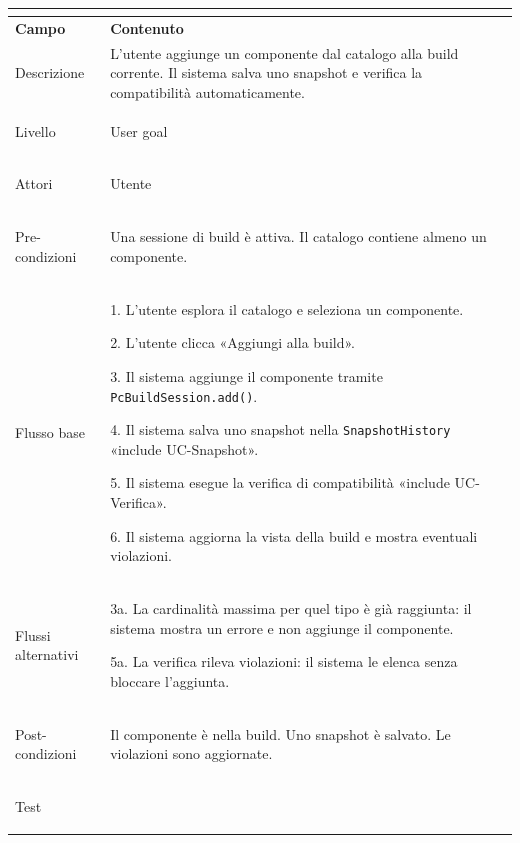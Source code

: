 \documentclass[11pt, a4paper]{article}
\begin{document}
\begin{tabularx}{\textwidth}{|>{\bfseries}p{3.8cm}|X|}

\hline

\multicolumn{2}{|l|}{\textbf{UC2 --- Aggiungi componente}} \\

\hline

Campo & \textbf{Contenuto} \\

\hline

Descrizione & L'utente aggiunge un componente dal catalogo alla build corrente. Il sistema salva uno snapshot e verifica la compatibilità automaticamente. \\

\hline

Livello & User goal \\

\hline

Attori & Utente \\

\hline

Pre-condizioni & Una sessione di build è attiva. Il catalogo contiene almeno un componente. \\

\hline

Flusso base & 

1. L'utente esplora il catalogo e seleziona un componente.\newline

2. L'utente clicca «Aggiungi alla build».\newline

3. Il sistema aggiunge il componente tramite \texttt{PcBuildSession.add()}.\newline

4. Il sistema salva uno snapshot nella \texttt{SnapshotHistory} «include UC-Snapshot».\newline

5. Il sistema esegue la verifica di compatibilità «include UC-Verifica».\newline

6. Il sistema aggiorna la vista della build e mostra eventuali violazioni. \\

\hline

Flussi alternativi & 

3a. La cardinalità massima per quel tipo è già raggiunta: il sistema mostra un errore e non aggiunge il componente.\newline

5a. La verifica rileva violazioni: il sistema le elenca senza bloccare l'aggiunta. \\

\hline

Post-condizioni & Il componente è nella build. Uno snapshot è salvato. Le violazioni sono aggiornate. \\

\hline

Test & \\

\hline

\end{tabularx}
\end{document}
